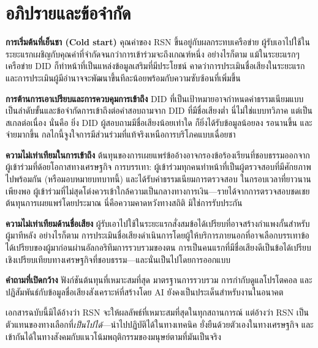 \documentclass[11pt,a4paper,twocolumn]{article}
\begin{document}
\section{อภิปรายและข้อจำกัด}

\textbf{การเริ่มต้นที่เย็นชา (Cold start)} คุณค่าของ RSN ขึ้นอยู่กับผลกระทบเครือข่าย ผู้รับเอาไปใช้ในระยะแรกเผชิญกับคุณค่าที่จำกัดจนกว่าการเข้าร่วมจะถึงเกณฑ์หนึ่ง อย่างไรก็ตาม แม้ในระยะแรกๆ เครือข่าย DID ก็ทำหน้าที่เป็นแหล่งข้อมูลเสริมที่มีประโยชน์ คาดว่าการประเมินชื่อเสียงในระยะแรกและการประเมินผู้มีอำนาจจะพัฒนาขึ้นทีละน้อยพร้อมกับความซับซ้อนที่เพิ่มขึ้น

\textbf{การต้านการเอาเปรียบและการควบคุมการเข้าถึง} DID ที่เป็นเป้าหมายอาจกำหนดค่าธรรมเนียมแบบเป็นลำดับขั้นและข้อจำกัดการเข้าถึงต่อคำสอบถามจาก DID ที่มีชื่อเสียงต่ำ นี่ไม่ใช่แบบทวิภาค แต่เป็นสเกลต่อเนื่อง นั่นคือ ยิ่ง DID ผู้สอบถามมีชื่อเสียงน้อยเท่าใด ก็ยิ่งได้รับข้อมูลน้อยลง รอนานขึ้น และจ่ายมากขึ้น กลไกนี้จูงใจการมีส่วนร่วมที่แท้จริงเหนือการบริโภคแบบเฉื่อยชา

\textbf{ความไม่เท่าเทียมในการเข้าถึง} ต้นทุนของการเผยแพร่ข้ออ้างอาจกรองข้อร้องเรียนที่ชอบธรรมออกจากผู้เข้าร่วมที่ด้อยโอกาสทางเศรษฐกิจ การบรรเทา: ผู้เข้าร่วมทุกคนทำหน้าที่เป็นผู้ตรวจสอบที่มีศักยภาพไปพร้อมกัน (หรือมอบหมายบทบาทนี้) และได้รับค่าธรรมเนียมการตรวจสอบ ในกรอบเวลาที่ยาวนานเพียงพอ ผู้เข้าร่วมที่ไม่สุดโต่งควรเข้าใกล้ความเป็นกลางทางการเงิน---รายได้จากการตรวจสอบชดเชยต้นทุนการเผยแพร่โดยประมาณ นี่คือความคาดหวังทางสถิติ มิใช่การรับประกัน

\textbf{ความไม่เท่าเทียมด้านชื่อเสียง} ผู้รับเอาไปใช้ในระยะแรกสั่งสมข้อได้เปรียบที่อาจสร้างกำแพงกั้นสำหรับผู้มาทีหลัง อย่างไรก็ตาม การประเมินชื่อเสียงดำเนินการโดยผู้ให้บริการภายนอกที่อาจเลือกบรรเทาข้อได้เปรียบของผู้มาก่อนผ่านอัลกอริทึมการรวบรวมของตน การเป็นคนแรกที่มีชื่อเสียงดีเป็นข้อได้เปรียบเชิงเปรียบเทียบทางเศรษฐกิจที่ชอบธรรม---และนั่นเป็นไปโดยการออกแบบ

\textbf{คำถามที่เปิดกว้าง} ฟังก์ชันต้นทุนที่เหมาะสมที่สุด มาตรฐานการรวบรวม การกำกับดูแลโปรโตคอล และปฏิสัมพันธ์กับข้อมูลชื่อเสียงสังเคราะห์ที่สร้างโดย AI ยังคงเป็นประเด็นสำหรับงานในอนาคต

เอกสารฉบับนี้มิได้อ้างว่า RSN จะให้ผลลัพธ์ที่เหมาะสมที่สุดในทุกสถานการณ์ แต่อ้างว่า RSN เป็นตัวแทนของทางเลือกที่\emph{เป็นไปได้}---นำไปปฏิบัติได้ในทางเทคนิค ยั่งยืนด้วยตัวเองในทางเศรษฐกิจ และเข้ากันได้ในทางสังคมกับแนวโน้มพฤติกรรมของมนุษย์ตามที่มันเป็นจริง

\end{document}
